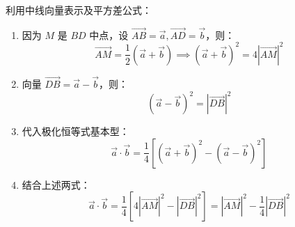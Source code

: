 \begin{proofbox}
利用中线向量表示及平方差公式：
\begin{enumerate}
    \item 因为 $M$ 是 $BD$ 中点，设 $\vec{AB} = \vec{a}, \vec{AD} = \vec{b}$，则：
    \[ \vec{AM} = \frac{1}{2}(\vec{a} + \vec{b}) \implies (\vec{a} + \vec{b})^2 = 4|\vec{AM}|^2 \]
    \item 向量 $\vec{DB} = \vec{a} - \vec{b}$，则：
    \[ (\vec{a} - \vec{b})^2 = |\vec{DB}|^2 \]
    \item 代入极化恒等式基本型：
    \[ \vec{a} \cdot \vec{b} = \frac{1}{4} [(\vec{a} + \vec{b})^2 - (\vec{a} - \vec{b})^2] \]
    \item 结合上述两式：
    \[ \vec{a} \cdot \vec{b} = \frac{1}{4} [4|\vec{AM}|^2 - |\vec{DB}|^2] = |\vec{AM}|^2 - \frac{1}{4}|\vec{DB}|^2 \]
\end{enumerate}
\end{proofbox}